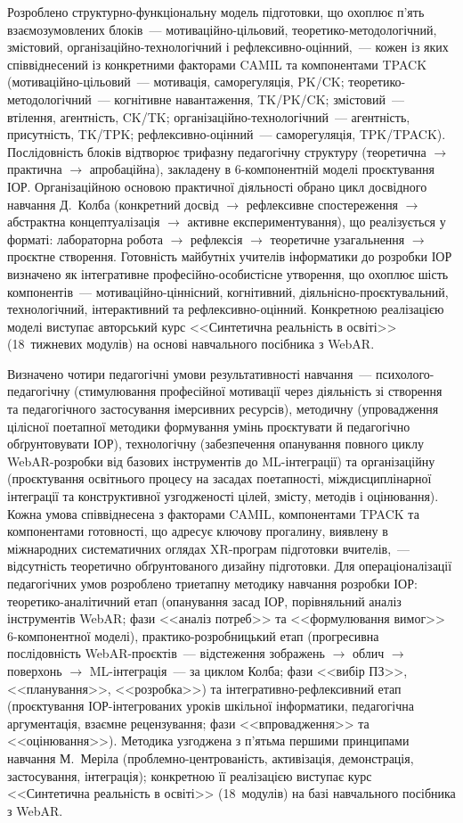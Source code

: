 Розроблено структурно-функціональну модель підготовки, що охоплює п'ять взаємозумовлених блоків~--- мотиваційно-цільовий, теоретико-методологічний, змістовий, організаційно-технологічний і рефлексивно-оцінний,~--- кожен із яких співвіднесений із конкретними факторами CAMIL та компонентами TPACK (мотиваційно-цільовий~--- мотивація, саморегуляція, PK/CK; теоретико-методологічний~--- когнітивне навантаження, TK/PK/CK; змістовий~--- втілення, агентність, CK/TK; організаційно-технологічний~--- агентність, присутність, TK/TPK; рефлексивно-оцінний~--- саморегуляція, TPK/TPACK). Послідовність блоків відтворює трифазну педагогічну структуру (теоретична $\to$ практична $\to$ апробаційна), закладену в 6-компонентній моделі проєктування ІОР. Організаційною основою практичної діяльності обрано цикл досвідного навчання Д.~Колба (конкретний досвід $\to$ рефлексивне спостереження $\to$ абстрактна концептуалізація $\to$ активне експериментування), що реалізується у форматі: лабораторна робота $\to$ рефлексія $\to$ теоретичне узагальнення $\to$ проєктне створення. Готовність майбутніх учителів інформатики до розробки ІОР визначено як інтегративне професійно-особистісне утворення, що охоплює шість компонентів~--- мотиваційно-ціннісний, когнітивний, діяльнісно-проєктувальний, технологічний, інтерактивний та рефлексивно-оцінний. Конкретною реалізацією моделі виступає авторський курс <<Синтетична реальність в освіті>> (18~тижневих модулів) на основі навчального посібника з WebAR.

Визначено чотири педагогічні умови результативності навчання~--- психолого-педагогічну (стимулювання професійної мотивації через діяльність зі створення та педагогічного застосування імерсивних ресурсів), методичну (упровадження цілісної поетапної методики формування умінь проєктувати й педагогічно обґрунтовувати ІОР), технологічну (забезпечення опанування повного циклу WebAR-розробки від базових інструментів до ML-інтеграції) та організаційну (проєктування освітнього процесу на засадах поетапності, міждисциплінарної інтеграції та конструктивної узгодженості цілей, змісту, методів і оцінювання). Кожна умова співвіднесена з факторами CAMIL, компонентами TPACK та компонентами готовності, що адресує ключову прогалину, виявлену в міжнародних систематичних оглядах XR-програм підготовки вчителів,~--- відсутність теоретично обґрунтованого дизайну підготовки. Для операціоналізації педагогічних умов розроблено триетапну методику навчання розробки ІОР: теоретико-аналітичний етап (опанування засад ІОР, порівняльний аналіз інструментів WebAR; фази <<аналіз потреб>> та <<формулювання вимог>> 6-компонентної моделі), практико-розробницький етап (прогресивна послідовність WebAR-проєктів~--- відстеження зображень $\to$ облич $\to$ поверхонь $\to$ ML-інтеграція~--- за циклом Колба; фази <<вибір ПЗ>>, <<планування>>, <<розробка>>) та інтегративно-рефлексивний етап (проєктування ІОР-інтегрованих уроків шкільної інформатики, педагогічна аргументація, взаємне рецензування; фази <<впровадження>> та <<оцінювання>>). Методика узгоджена з п'ятьма першими принципами навчання М.~Меріла (проблемно-центрованість, активізація, демонстрація, застосування, інтеграція); конкретною її реалізацією виступає курс <<Синтетична реальність в освіті>> (18~модулів) на базі навчального посібника з WebAR.

